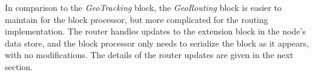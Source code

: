 In comparison to the {\em GeoTracking} block, the {\em GeoRouting} block is easier to maintain for the block processor, but more complicated for the routing implementation. The router handles updates to the extension block in the node's data store, and the block processor only needs to serialize the block as it appears, with no modifications.  The details of the router updates are given in the next section.


